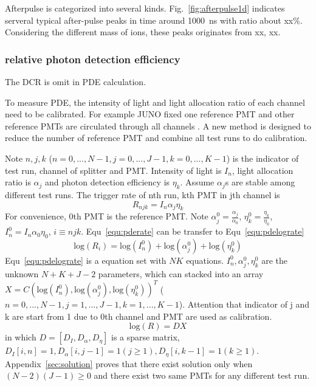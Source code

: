 Afterpulse is categorized into several kinds. Fig.~\ref{fig:afterpulse1d} indicates serveral typical after-pulse peaks in time around \SI{1000}{ns} with ratio about xx\%. Considering the different mass of ions, these peaks originates from xx, xx.

\subsubsection{relative photon detection efficiency}
The DCR is omit in PDE calculation.

To measure PDE, the intensity of light and light allocation ratio of each channel need to be calibrated. For example JUNO fixed one reference PMT and other reference PMTs are circulated through all channels \cite{Wonsak_2021}. A new method is designed to reduce the number of reference PMT and combine all test runs to do calibration.  

Note $n,j,k$ ($n=0,...,N-1, j=0,...,J-1, k=0,...,K-1$) is the indicator of test run, channel of splitter and PMT. Intensity of light is $I_n$, light allocation ratio is $\alpha_j$ and photon detection efficiency is $\eta_k$. Assume $\alpha_j$s are stable among different test runs. The trigger rate of nth run, kth PMT in jth channel is
\begin{equation}
    \label{equ:pderate}
    R_{njk}=I_n\alpha_j\eta_k
\end{equation}
For convenience, 0th PMT is the reference PMT. Note $\alpha_j^0=\frac{\alpha_j}{\alpha_0}$, $\eta_k^0=\frac{\eta_k}{\eta_0}$, $I_n^0=I_n\alpha_0\eta_0$, $i\equiv njk$. Equ~\eqref{equ:pderate} can be transfer to Equ~\eqref{equ:pdelograte}
\begin{equation}
    \label{equ:pdelograte}
    \mathrm{log}(R_{i})=\mathrm{log}(I_n^0)+\mathrm{log}(\alpha_j^0)+\mathrm{log}(\eta_k^0)
\end{equation}
Equ~\eqref{equ:pdelograte} is a equation set with $NK$ equations. $I_n^0,\alpha_j^0,\eta_k^0$ are the unknown $N+K+J-2$ parameters, which can stacked into an array $X = C(\mathrm{log}(I_n^0), \mathrm{log}(\alpha_j^0),\mathrm{log}(\eta_k^0))^T$ ($n=0,...,N-1, j=1,...,J-1, k=1,...,K-1$). Attention that indicator of j and k are start from 1 due to 0th channel and PMT are used as calibration. 
\begin{equation}
    \mathrm{log}(R)=DX
\end{equation}
in which $D=[D_I,D_\alpha, D_\eta]$ is a sparse matrix, $D_I[i,n]=1,D_\alpha[{i},j-1]=1(j\geq1), D_\eta[{i},k-1]=1(k\geq1)$. 
Appendix~\ref{sec:solution} proves that there exist solution only when $(N-2)(J-1)\geq0$ and there exist two same PMTs for any different test run.

